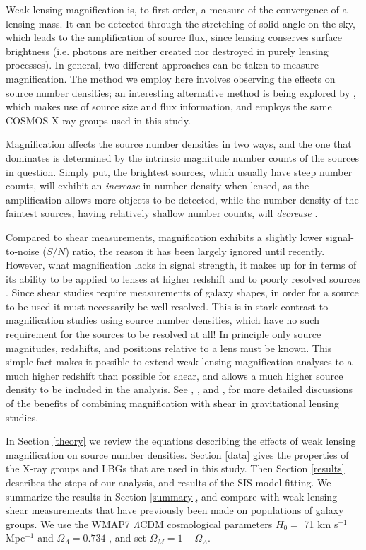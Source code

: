 Weak lensing magnification is, to first order, a measure of the convergence of a lensing mass.  It can be detected through the stretching of solid angle on the sky, which leads to the amplification of source flux, since lensing conserves surface brightness (i.e. photons are neither created nor destroyed in purely lensing processes). In general, two different approaches can be taken to measure magnification.  The method we employ here involves observing the effects on source number densities; an interesting alternative method is being explored by \citet{Schmidt12}, which makes use of source size and flux information, and employs the same \ac{COSMOS} X-ray groups used in this study.

Magnification affects the source number densities in two ways, and the one that dominates is determined by the intrinsic magnitude number counts of the sources in question.  Simply put, the brightest sources, which usually have steep number counts, will exhibit an {\it increase} in number density when lensed, as the amplification allows more objects to be detected, while the number density of the faintest sources, having relatively shallow number counts, will {\it decrease} \citep{Narayan89}.

Compared to shear measurements, magnification exhibits a slightly lower signal-to-noise ($S/N$) ratio, the reason it has been largely ignored until recently.  However, what magnification lacks in signal strength, it makes up for in terms of its ability to be applied to lenses at higher redshift and to poorly resolved sources \citep{Waerbeke10}.  Since shear studies require measurements of galaxy shapes, in order for a source to be used it must necessarily be well resolved.  This is in stark contrast to magnification studies using source number densities, which have no such requirement for the sources to be resolved at all!  In principle only source magnitudes, redshifts, and positions relative to a lens must be known.  This simple fact makes it possible to extend weak lensing magnification analyses to a much higher redshift than possible for shear, and allows a much higher source density to be included in the analysis.  See \citet{Waerbeke10}, \citet{RozoSchmidt10}, and \citet{Umetsu11}, for more detailed discussions of the benefits of combining magnification with shear in gravitational lensing studies. 

In Section \ref{theory} we review the equations describing the effects of weak lensing magnification on source number densities.  Section \ref{data} gives the properties of the X-ray groups and \ac{LBG}s that are used in this study.  Then Section \ref{results} describes the steps of our analysis, and results of the \ac{SIS} model fitting.  We summarize the results in Section \ref{summary}, and compare with weak lensing shear measurements that have previously been made on populations of galaxy groups.  We use the WMAP7 $\Lambda$CDM cosmological parameters $H_0 =$ 71 km s$^{-1}$ Mpc$^{-1}$ and $\Omega_{\Lambda} = 0.734$ \citep{WMAP7}, and set $\Omega_M = 1 - \Omega_{\Lambda}$.

